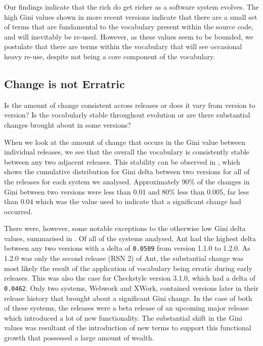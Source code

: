 Our findings indicate that the rich do get richer as a software system evolves. The high Gini values shown in more recent versions indicate that there are a small set of terms that are fundamental to the vocabulary present within the source code, and will inevitably be re-used. However, as these values seem to be bounded, we postulate that there are terms within the vocabulary that will see occasional heavy re-use, despite not being a core component of the vocabulary.


\subsection{Change is not Erratric} %
\label{ssub:change_is_not_erratric}

Is the amount of change consistent across releases or does it vary from version to version? Is the vocabularly stable throughout evolution or are there substantial changes brought about in some versions?

When we look at the amount of change that occurs in the Gini value between individual releases, we see that the overall the vocabulary is consistently stable between any two adjacent releases. This stability can be observed in , which shows the cumulative distribution for Gini delta between two versions for all of the releases for each system we analysed. Approximately 90\% of the changes in Gini between two versions were less than 0.01 and 80\% less than 0.005, far less than 0.04 which was the value used to indicate that a significant change had occurred.

There were, however, some notable exceptions to the otherwise low Gini delta values, summarised in . Of all of the systems analysed, Ant had the highest delta between any two versions with a delta of \texttt{0.0509} from version 1.1.0 to 1.2.0. As 1.2.0 was only the second release (RSN 2) of Ant, the substantial change was most likely the result of the application of vocabulary being erratic during early releases. This was also the case for Checkstyle version 3.1.0, which had a delta of \texttt{0.0462}. Only two systems, Webwork and XWork, contained versions later in their release history that brought about a significant Gini change. In the case of both of these systems, the releases were a beta release of an upcoming major release which introduced a lot of new functionality. The substantial shift in the Gini values was resultant of the introduction of new terms to support this functional growth that possessed a large amount of wealth.

